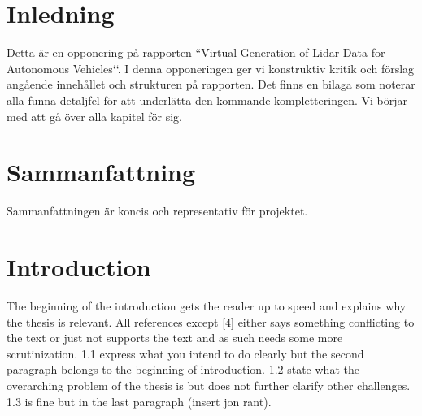 \documentclass[12pt,a4paper,twoside,openright]{report}
\begin{document}
 


\newcommand{\varHeadline}{Opponering av DATX02-17-10}
\newcommand{\varSubtitle}{Av DATX02-17-12}
\newcommand{\varDepartment}{Department of Computer Science and Engineering}
\newcommand{\varNames}{André Perzon, Björn Strömberg, Chi Thong Luong,  \\
Elias Forsberg, Jesper Åberg, Jon Johnsson}




\section*{Inledning}

Detta är en opponering på rapporten ``Virtual Generation of Lidar Data for
Autonomous Vehicles‘‘. I denna opponeringen ger vi konstruktiv kritik och
förslag angående innehållet och strukturen på rapporten. Det finns en bilaga
som noterar alla funna detaljfel för att underlätta den kommande
kompletteringen. Vi börjar med att gå över alla kapitel för sig. 

\section*{Sammanfattning}

Sammanfattningen är koncis och representativ för projektet.

\section*{Introduction}

The beginning of the introduction gets the reader up to speed and explains why
the thesis is relevant. All references except [4] either says something
conflicting to the text or just not supports the text and as such needs some
more scrutinization. 1.1 express what you intend to do clearly but the second
paragraph belongs to the beginning of introduction. 1.2 state what the
overarching problem of the thesis is but does not further clarify other
challenges. 1.3 is fine but in the last paragraph (insert jon rant).
\end{document}
